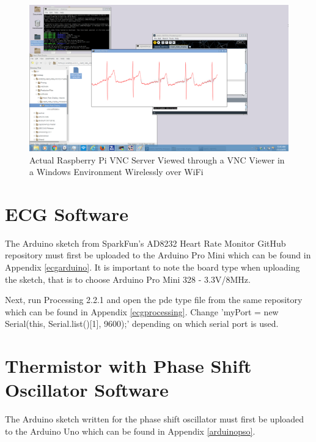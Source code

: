 \begin{figure}[H]
	\centering
	\includegraphics[width=\linewidth]{vncserver.png}
	\caption{Actual Raspberry Pi VNC Server Viewed through a VNC Viewer in a Windows Environment Wirelessly over WiFi}
	\label{vncserver}
\end{figure} 

\section{ECG Software}

The Arduino sketch from SparkFun's AD8232 Heart Rate Monitor GitHub repository must first be uploaded to the Arduino Pro Mini \cite{ad8232github} which can be found in Appendix \ref{ecgarduino}. It is important to note the board type when uploading the sketch, that is to choose Arduino Pro Mini 328 - 3.3V/8MHz. 

Next, run Processing 2.2.1 and open the pde type file from the same repository \cite{ad8232github} which can be found in Appendix \ref{ecgprocessing}. Change 'myPort = new Serial(this, Serial.list()[1], 9600);' depending on which serial port is used. 

\section{Thermistor with Phase Shift Oscillator Software}

The Arduino sketch written for the phase shift oscillator must first be uploaded to the Arduino Uno which can be found in Appendix \ref{arduinopso}.

